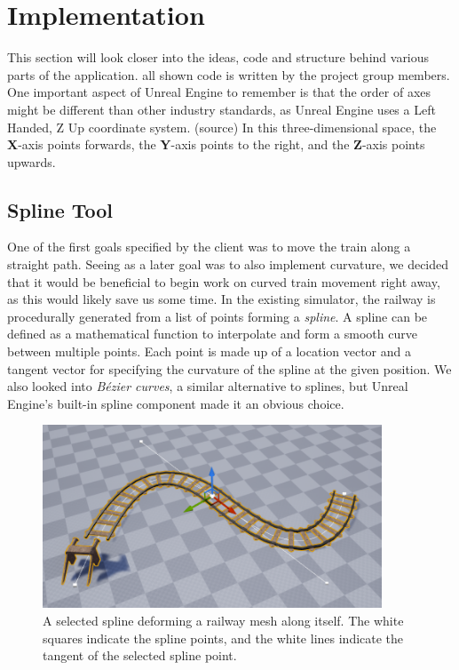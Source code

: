 \section{Implementation} %


This section will look closer into the ideas, code and structure behind various parts of the application. all shown code is written by the project group members. One important aspect of Unreal Engine to remember is that the order of axes might be different than other industry standards, as Unreal Engine uses a Left Handed, Z Up coordinate system. (source) In this three-dimensional space, the \textbf{X}-axis points forwards, the \textbf{Y}-axis points to the right, and the \textbf{Z}-axis points upwards. 

\subsection{Spline Tool}

One of the first goals specified by the client was to move the train along a straight path. Seeing as a later goal was to also implement curvature, we decided that it would be beneficial to begin work on curved train movement right away, as this would likely save us some time. In the existing simulator, the railway is procedurally generated from a list of points forming a \textit{spline}. A spline can be defined as a mathematical function to interpolate and form a smooth curve between multiple points. Each point is made up of a location vector and a tangent vector for specifying the curvature of the spline at the given position. We also looked into \textit{Bézier curves}, a similar alternative to splines, but Unreal Engine's built-in spline component made it an obvious choice. \newline

\begin{figure}[h]
    \centerline{\includegraphics[width=0.9\textwidth]{figures/Spline1.png}}
    \caption[size=small]{A selected spline deforming a railway mesh along itself. The white squares indicate the spline points, and the white lines indicate the tangent of the selected spline point.}
\end{figure} 


